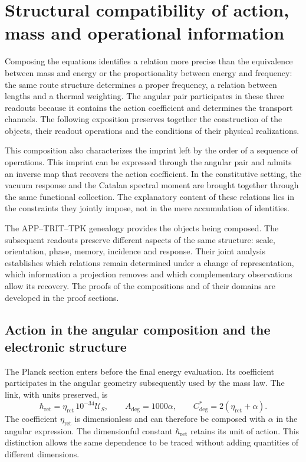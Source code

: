 \section{Structural compatibility of action, mass and operational information}
\label{sec:narrativa-estructural}

Composing the equations identifies a relation more precise
than the equivalence between mass and energy or the proportionality between energy
and frequency: the same route structure determines a proper frequency,
a relation between lengths and a thermal weighting. The angular pair
participates in these three readouts because it contains the action coefficient and
determines the transport channels. The following exposition preserves
together the construction of the objects, their readout operations and
the conditions of their physical realizations.

This composition also characterizes the imprint left by the order
of a sequence of operations. This imprint can be expressed through
the angular pair and admits an inverse map that recovers the action
coefficient. In the constitutive setting, the vacuum response and the
Catalan spectral moment are brought together through the same functional collection. The
explanatory content of these relations lies in the constraints they
jointly impose, not in the mere accumulation of identities.

The APP--TRIT--TPK genealogy provides the objects being composed. The
subsequent readouts preserve different aspects of the same structure:
scale, orientation, phase, memory, incidence and response. Their joint
analysis establishes which relations remain determined under a change of
representation, which information a projection removes and which complementary
observations allow its recovery. The proofs of the compositions
and of their domains are developed in the proof sections.

\subsection{Action in the angular composition and the electronic structure}
\label{subsec:narrativa-accion-angular}

The Planck section enters before the final energy evaluation.
Its coefficient participates in the angular geometry subsequently used
by the mass law. The link, with units preserved, is
\begin{equation}
 \hbar_{\mathrm{ret}}
   =\eta_{\mathrm{ret}}\,10^{-34}\mathcal U_S,
 \qquad
 A_{\deg}=1000\alpha,
 \qquad
 C^*_{\deg}=2(\eta_{\mathrm{ret}}+\alpha).
 \label{eq:narrativa-par-angular}
\end{equation}
The coefficient $\eta_{\mathrm{ret}}$ is dimensionless and can therefore
be composed with $\alpha$ in the angular expression. The dimensionful constant
$\hbar_{\mathrm{ret}}$ retains its unit of action. This distinction allows
the same dependence to be traced without adding quantities of different dimensions.

